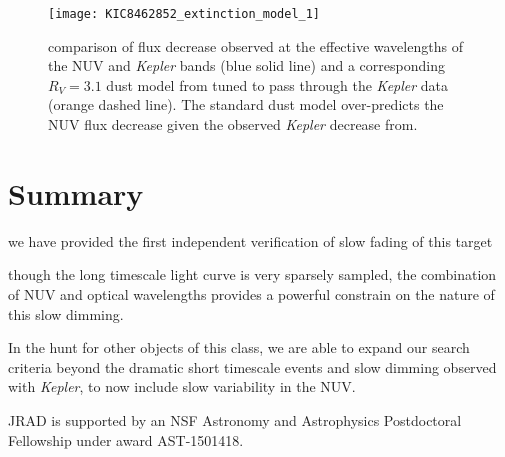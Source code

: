 \documentclass[twocolumn]{aastex6}
\newcommand{\Kepler}{\textsl{Kepler}\xspace}
\begin{document}
\begin{figure}[]
\centering
\texttt{[image: KIC8462852\_extinction\_model\_1]}
\caption{comparison of flux decrease observed at the effective wavelengths of the NUV and \Kepler bands (blue solid line) and a corresponding $R_V=3.1$ dust model from \citet{cardelli1989} tuned to pass through the \Kepler data (orange dashed line). The standard dust model over-predicts the NUV flux decrease given the observed \Kepler decrease from\citet{montet2016}.}
\label{fig:dust}
\end{figure}



\section{Summary}
we have provided the first independent verification of slow fading of this target

though the long timescale light curve is very sparsely sampled, the combination of NUV and optical wavelengths provides a powerful constrain on the nature of this slow dimming. 

In the hunt for other objects of this class, we are able to expand our search criteria beyond the dramatic short timescale events and slow dimming observed with \Kepler, to now include slow variability in the NUV. 



\acknowledgments
JRAD is supported by an NSF Astronomy and Astrophysics Postdoctoral Fellowship under award AST-1501418. 



\end{document}
